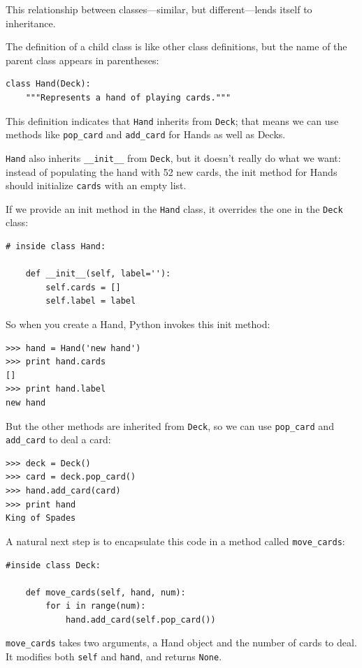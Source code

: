 \documentclass[10pt]{book}
\begin{document}
\begin{CJK}{UTF8}{gbsn}
This relationship between classes---similar, but different---lends
itself to inheritance.  

The definition of a child class is like other class definitions,
but the name of the parent class appears in parentheses:

\begin{verbatim}
class Hand(Deck):
    """Represents a hand of playing cards."""
\end{verbatim}
%
This definition indicates that {\tt Hand} inherits from {\tt Deck};
that means we can use methods like \verb"pop_card" and \verb"add_card"
for Hands as well as Decks.

{\tt Hand} also inherits \verb"__init__" from {\tt Deck}, but
it doesn't really do what we want: instead of populating the hand
with 52 new cards, the init method for Hands should initialize
{\tt cards} with an empty list.

If we provide an init method in the {\tt Hand} class, it overrides the
one in the {\tt Deck} class:

\begin{verbatim}
# inside class Hand:

    def __init__(self, label=''):
        self.cards = []
        self.label = label
\end{verbatim}
%
So when you create a Hand, Python invokes this init method:

\begin{verbatim}
>>> hand = Hand('new hand')
>>> print hand.cards
[]
>>> print hand.label
new hand
\end{verbatim}
%
But the other methods are inherited from {\tt Deck}, so we can use
\verb"pop_card" and \verb"add_card" to deal a card:

\begin{verbatim}
>>> deck = Deck()
>>> card = deck.pop_card()
>>> hand.add_card(card)
>>> print hand
King of Spades
\end{verbatim}
%
A natural next step is to encapsulate this code in a method
called \verb"move_cards":

\begin{verbatim}
#inside class Deck:

    def move_cards(self, hand, num):
        for i in range(num):
            hand.add_card(self.pop_card())
\end{verbatim}
%
\verb"move_cards" takes two arguments, a Hand object and the number of
cards to deal.  It modifies both {\tt self} and {\tt hand}, and
returns {\tt None}.


\end{CJK}
\end{document}
